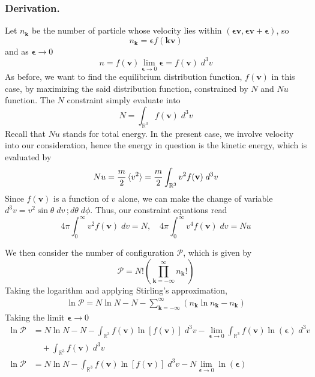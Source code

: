 \documentclass[../../../Main.tex]{subfiles}
\begin{document}
\subsubsection*{Derivation.} Let $n_\mathbf{k}$ be the number of particle whose velocity lies within $(\boldsymbol{\epsilon}\mathbf{v},\boldsymbol{\epsilon}\mathbf{v}+\boldsymbol{\epsilon})$, so
\begin{equation*}
    n_\mathbf{k}=\boldsymbol{\epsilon}f(\mathbf{kv})
\end{equation*}
and as $\boldsymbol{\epsilon}\rightarrow0$
\begin{equation*}
    n=f(\mathbf{v})\lim_{\boldsymbol{\epsilon}\rightarrow0}\boldsymbol{\epsilon}=f(\mathbf{v})\;d^3v
\end{equation*}
As before, we want to find the equilibrium distribution function, $f(\mathbf{ v})$ in this case, by maximizing the said distribution function, constrained by $N$ and $Nu$ function. The $N$ constraint simply evaluate into 
\begin{equation*}
    N=\int_{\mathbb{R}^3}  f(\mathbf{v})\;d^3v
\end{equation*}
Recall that $Nu$ stands for total energy. In the present case, we involve velocity into our consideration, hence the energy in question is the kinetic energy, which is evaluated by
\begin{equation*}
    Nu=\frac{m}{2}\braket{v^2}=\frac{m}{2}\int_{\mathbb{R}^3} v^2f(\mathbf{v})\;d^3v
\end{equation*} 
Since $f(\mathbf{v})$ is a function of $v$ alone, we can make the change of variable $d^3v=v^2\sin\theta\;dv\,; d\theta\; d\phi$. Thus, our constraint equations read
\begin{equation*}
    4\pi\int_{0}^{\infty}v^2f(\mathbf{v})\;dv=N, \quad 4\pi \int_{0}^{\infty}v^4f(\mathbf{v})\;dv=Nu
\end{equation*}

We then consider the number of configuration $\mathcal{P}$, which is given by 
\begin{equation*}
    \mathcal{P}=N!\left(\prod_{\mathbf{k}=-\infty}^{\infty}n_\mathbf{k}!\right)
\end{equation*}
Taking the logarithm and applying Stirling's approximation,
\begin{align*}
    \ln \mathcal{P}=N\ln N-N-\sum_{\mathbf{k=-\infty}}^{\infty}\left(n_\mathbf{k}\ln n_\mathbf{k}-n_\mathbf{k} \right)
\end{align*}
Taking the limit $\boldsymbol{\epsilon}\rightarrow0$
\begin{align*}
    \ln \mathcal{P}&=N\ln N-N - \int_{\mathbb{R}^3}f(\mathbf{v})\ln [f(\mathbf{v})]\;d^3v - \lim_{\boldsymbol{\epsilon}\rightarrow0} \int_{\mathbb{R}^3}f(\mathbf{v})\ln (\boldsymbol{\epsilon})\;d^3v\\
    &\quad+\int_{\mathbb{R}^3}f(\mathbf{v})\;d^3v\\
    \ln \mathcal{P}&=N\ln N - \int_{\mathbb{R}^3}f(\mathbf{v})\ln [f(\mathbf{v})]\;d^3v -N\lim_{\boldsymbol{\epsilon}\rightarrow0}\ln (\boldsymbol{\epsilon})
\end{align*}
\end{document}
